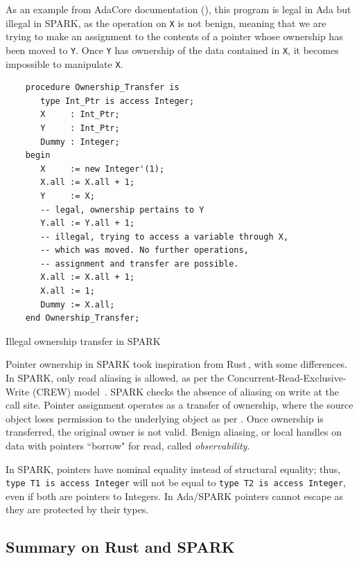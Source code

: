 \documentclass[nomenclature, english, bibtex]{kththesis}
\newcommand{\inlinecode}[1]{\texttt{#1}}
\begin{document}
As an example from AdaCore documentation (), this program is legal in Ada but illegal in SPARK, as the operation on \texttt{X} is not benign, meaning that we are trying to make an assignment to the contents of a pointer whose \gls{ownership} has been moved to \texttt{Y}. Once \texttt{Y} has ownership of the data contained in \texttt{X}, it becomes impossible to manipulate \texttt{X}.

\begin{listing}[!ht]
    \begin{verbatim}
    procedure Ownership_Transfer is
       type Int_Ptr is access Integer;
       X     : Int_Ptr;
       Y     : Int_Ptr;
       Dummy : Integer;
    begin
       X     := new Integer'(1);
       X.all := X.all + 1;
       Y     := X;
       -- legal, ownership pertains to Y
       Y.all := Y.all + 1;  
       -- illegal, trying to access a variable through X,
       -- which was moved. No further operations, 
       -- assignment and transfer are possible.
       X.all := X.all + 1;  
       X.all := 1;          
       Dummy := X.all;      
    end Ownership_Transfer;
    \end{verbatim}
    \caption[Illegal ownership transfer in SPARK]{Illegal ownership transfer in SPARK}
    \label{lstlisting:spark_illegal_transfer}
\end{listing}

Pointer ownership in SPARK took inspiration from Rust\,\cite{dross_using_2019}, with some differences. In SPARK, only read aliasing is allowed, as per the Concurrent-Read-Exclusive-Write (CREW) model~\cite{moy_proof_2019}. SPARK checks the absence of aliasing on write at the call site. Pointer assignment operates as a transfer of ownership, where the source object loses permission to the underlying object as per . Once ownership is transferred, the original owner is not valid. Benign aliasing, or local handles on data with pointers ``borrow" for read, called \emph{observability}.

In SPARK, pointers have nominal equality instead of structural equality; thus, \inlinecode{type T1 is access Integer} will not be equal to \inlinecode{type T2 is access Integer}, even if both are pointers to Integers. In Ada/SPARK pointers cannot escape as they are protected by their types. 


\subsection{Summary on Rust and SPARK}
\end{document}
